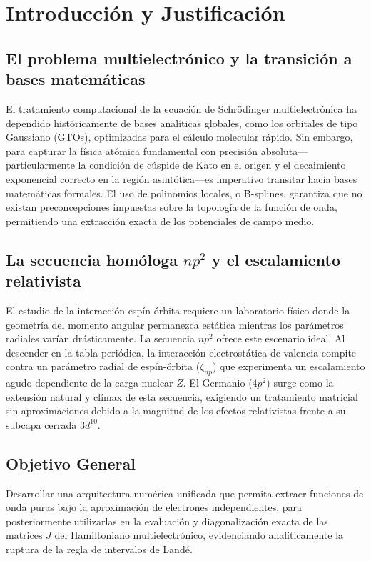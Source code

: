 \documentclass[12pt,a4paper]{book}
\begin{document}
\section{Introducción y Justificación}

\subsection{El problema multielectrónico y la transición a bases matemáticas}
El tratamiento computacional de la ecuación de Schrödinger multielectrónica ha dependido históricamente de bases analíticas globales, como los orbitales de tipo Gaussiano (GTOs), optimizadas para el cálculo molecular rápido. Sin embargo, para capturar la física atómica fundamental con precisión absoluta—particularmente la condición de cúspide de Kato en el origen y el decaimiento exponencial correcto en la región asintótica—es imperativo transitar hacia bases matemáticas formales. El uso de polinomios locales, o B-splines, garantiza que no existan preconcepciones impuestas sobre la topología de la función de onda, permitiendo una extracción exacta de los potenciales de campo medio.

\subsection{La secuencia homóloga $np^2$ y el escalamiento relativista}
El estudio de la interacción espín-órbita requiere un laboratorio físico donde la geometría del momento angular permanezca estática mientras los parámetros radiales varían drásticamente. La secuencia $np^2$ ofrece este escenario ideal. Al descender en la tabla periódica, la interacción electrostática de valencia compite contra un parámetro radial de espín-órbita ($\zeta_{np}$) que experimenta un escalamiento agudo dependiente de la carga nuclear $Z$. El Germanio ($4p^2$) surge como la extensión natural y clímax de esta secuencia, exigiendo un tratamiento matricial sin aproximaciones debido a la magnitud de los efectos relativistas frente a su subcapa cerrada $3d^{10}$.

\subsection{Objetivo General}
Desarrollar una arquitectura numérica unificada que permita extraer funciones de onda puras bajo la aproximación de electrones independientes, para posteriormente utilizarlas en la evaluación y diagonalización exacta de las matrices $J$ del Hamiltoniano multielectrónico, evidenciando analíticamente la ruptura de la regla de intervalos de Landé.
\end{document}
